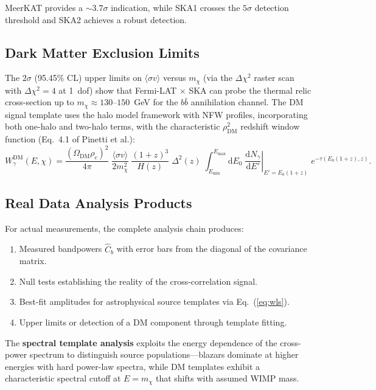 \documentclass[10pt,a4paper]{article}
\newcommand{\sigmav}{\langle\sigma v\rangle}
\newcommand{\mchi}{m_\chi}
\begin{document}
MeerKAT provides a $\sim 3.7\sigma$ indication, while SKA1 crosses the $5\sigma$ detection threshold and SKA2 achieves a robust detection.


\subsection{Dark Matter Exclusion Limits}

The $2\sigma$ (95.45\% CL) upper limits on $\sigmav$ versus $\mchi$ (via the $\Delta\chi^2$ raster scan with $\Delta\chi^2 = 4$ at 1~dof) show that Fermi-LAT $\times$ SKA can probe the thermal relic cross-section up to $\mchi \approx 130$--$150$~GeV for the $b\bar{b}$ annihilation channel. The DM signal template uses the halo model framework with NFW profiles, incorporating both one-halo and two-halo terms, with the characteristic $\rho_{\mathrm{DM}}^2$ redshift window function (Eq.~4.1 of Pinetti et al.):
\begin{equation}
W_\gamma^{\mathrm{DM}}(E,\chi) = \frac{(\Omega_{\mathrm{DM}}\rho_c)^2}{4\pi}\;
\frac{\sigmav}{2\mchi^2}\;
\frac{(1+z)^3}{H(z)}\;\Delta^2(z)\;
\int_{E_{\min}}^{E_{\max}} \mathrm{d}E_0\;
\left.\frac{\mathrm{d}N_\gamma}{\mathrm{d}E'}\right|_{E'=E_0(1+z)}\;
e^{-\tau(E_0(1+z),z)}.
\end{equation}


\subsection{Real Data Analysis Products}

For actual measurements, the complete analysis chain produces:
\begin{enumerate}[leftmargin=2em]
\item Measured bandpowers $\hat{C}_b$ with error bars from the diagonal of the covariance matrix.
\item Null tests establishing the reality of the cross-correlation signal.
\item Best-fit amplitudes for astrophysical source templates via Eq.~(\ref{eq:wls}).
\item Upper limits or detection of a DM component through template fitting.
\end{enumerate}

The \textbf{spectral template analysis} exploits the energy dependence of the cross-power spectrum to distinguish source populations---blazars dominate at higher energies with hard power-law spectra, while DM templates exhibit a characteristic spectral cutoff at $E = \mchi$ that shifts with assumed WIMP mass.
\end{document}
